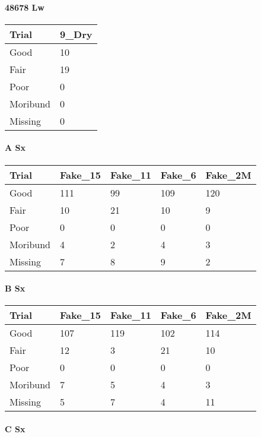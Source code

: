 \documentclass[
]{article}
\begin{document}
\hypertarget{lw-4}{%
\paragraph{48678 Lw}\label{lw-4}}

\begin{tabular}{l|l}
\hline
Trial & 9\_Dry\\
\hline
Good & 10\\
\hline
Fair & 19\\
\hline
Poor & 0\\
\hline
Moribund & 0\\
\hline
Missing & 0\\
\hline
\end{tabular}

\hypertarget{a-sx}{%
\paragraph{A Sx}\label{a-sx}}

\begin{tabular}{l|l|l|l|l}
\hline
Trial & Fake\_15 & Fake\_11 & Fake\_6 & Fake\_2M\\
\hline
Good & 111 & 99 & 109 & 120\\
\hline
Fair & 10 & 21 & 10 & 9\\
\hline
Poor & 0 & 0 & 0 & 0\\
\hline
Moribund & 4 & 2 & 4 & 3\\
\hline
Missing & 7 & 8 & 9 & 2\\
\hline
\end{tabular}

\hypertarget{b-sx}{%
\paragraph{B Sx}\label{b-sx}}

\begin{tabular}{l|l|l|l|l}
\hline
Trial & Fake\_15 & Fake\_11 & Fake\_6 & Fake\_2M\\
\hline
Good & 107 & 119 & 102 & 114\\
\hline
Fair & 12 & 3 & 21 & 10\\
\hline
Poor & 0 & 0 & 0 & 0\\
\hline
Moribund & 7 & 5 & 4 & 3\\
\hline
Missing & 5 & 7 & 4 & 11\\
\hline
\end{tabular}

\hypertarget{c-sx}{%
\paragraph{C Sx}\label{c-sx}}
\end{document}
